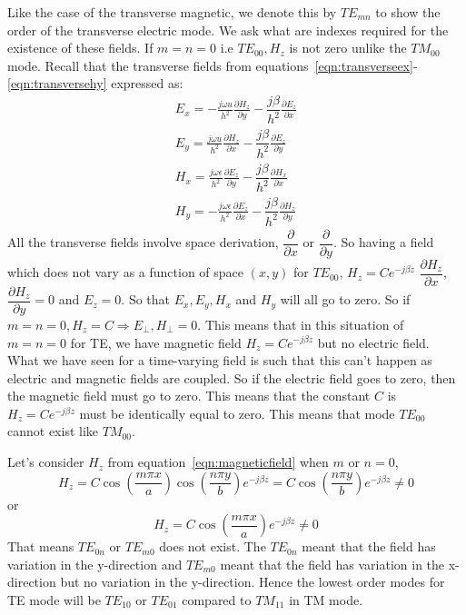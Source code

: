 Like the case of the transverse magnetic, we denote this by $TE_{mn}$ to show the order of the transverse electric mode. We ask what are indexes required for the existence of these fields. If $m = n = 0$ i.e $TE_{00},H_z$ is not zero unlike the $TM_{00}$ mode. Recall that the transverse fields from equations~\ref{eqn:transverseex}-\ref{eqn:transversehy} expressed as:
\begin{align*}
E_x = -\frac{j\omega u}{h^2}\frac{\partial H_z}{\partial y} - \dfrac{j\beta}{h^2}\frac{\partial E_z}{\partial x}\\
E_y = \frac{j\omega u}{h^2}\frac{\partial H_z}{\partial x} - \dfrac{j\beta}{h^2}\frac{\partial E_z}{\partial y}\\
H_x = \frac{j\omega \epsilon}{h^2}\frac{\partial E_z}{\partial y} - \dfrac{j\beta}{h^2}\frac{\partial H_x}{\partial x}\\
H_y = -\frac{j\omega \epsilon}{h^2}\frac{\partial E_z}{\partial x} - \dfrac{j\beta}{h^2}\frac{\partial H_z}{\partial y}
\end{align*}
All the transverse fields involve space derivation, $\dfrac{\partial}{\partial x}$ or $\dfrac{\partial}{\partial y}$. So having a field which does not vary as a function of space $(x,y)$ for $TE_{00}$, $H_z = Ce^{-j\beta z}$  $\dfrac{\partial H_z}{\partial x}$,  $\dfrac{\partial H_z}{\partial y} = 0$ and $E_z = 0$. So that $E_x, E_y, H_x$ and $H_y$ will all go to zero. So if $m = n = 0, H_z = C \Rightarrow E_\bot , H_\bot = 0$. This means that in this situation of $m = n = 0$ for TE, we have magnetic field $H_z = Ce^{-j\beta z}$ but no electric field. What we have seen for a time-varying field is such that this can't happen as electric and magnetic fields are coupled. So if the electric field goes to zero, then the magnetic field must go to zero. This means that the constant $C$ is $H_z = Ce^{-j\beta z}$ must be identically equal to zero. This means that mode $TE_{00}$ cannot exist like $TM_{00}$.

Let's consider $H_z$ from equation~\ref{eqn:magneticfield} when $m$ or $n = 0$,
\begin{dmath*}
H_z = C \cos \left(\frac{m\pi x}{a}\right)\cos\left(\frac{n\pi y}{b}\right)e^{-j\beta z} = C \cos \left(\frac{n\pi y}{b}\right)e^{-j\beta z} \neq 0 
\end{dmath*}
or 
\begin{dmath*}
H_z = C \cos \left(\frac{m\pi x}{a}\right)e^{-j\beta z} \neq 0 
\end{dmath*}
That means $TE_{0n}$ or $TE_{m0}$ does not exist. The $TE_{0n}$ meant that the field has variation in the y-direction and $TE_{m0}$ meant that the field has variation in the x-direction but no variation in the y-direction. Hence the lowest order modes for TE mode will be $TE_{10}$ or $TE_{01}$ compared to $TM_{11}$ in TM mode. 

